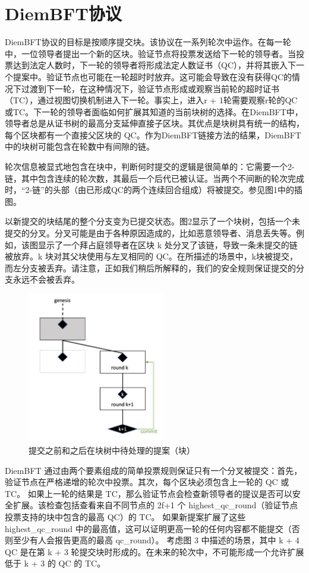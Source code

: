 \section{DiemBFT协议}

DiemBFT协议的目标是按顺序提交块。该协议在一系列轮次中运作。在每一轮中，一位领导者提出一个新的区块。验证节点将投票发送给下一轮的领导者。当投票达到法定人数时，下一轮的领导者将形成法定人数证书（QC），并将其嵌入下一个提案中。验证节点也可能在一轮超时时放弃。这可能会导致在没有获得QC的情况下过渡到下一轮，在这种情况下，验证节点形成或观察当前轮的超时证书（TC），通过视图切换机制进入下一轮。事实上，进入r + 1轮需要观察r轮的QC或TC。下一轮的领导者面临如何扩展其知道的当前块树的选择。在DiemBFT中，领导者总是从证书树的最高分支延伸直接子区块。其优点是块树具有统一的结构，每个区块都有一个直接父区块的 QC。作为DiemBFT链接方法的结果，DiemBFT中的块树可能包含在轮数中有间隙的链。

轮次信息被显式地包含在块中，判断何时提交的逻辑是很简单的：它需要一个2-链，其中包含连续的轮次数，其最后一个后代已被认证。当两个不间断的轮次完成时，“2-链”的头部（由已形成QC的两个连续回合组成）将被提交。参见图1中的插图。

以新提交的块结尾的整个分支变为已提交状态。图2显示了一个块树，包括一个未提交的分叉。分叉可能是由于各种原因造成的，比如恶意领导者、消息丢失等。例如，该图显示了一个拜占庭领导者在区块 k 处分叉了该链，导致一条未提交的链被放弃。k 块对其父块使用与左叉相同的 QC。在所描述的场景中，k块被提交，而左分支被丢弃。请注意，正如我们稍后所解释的，我们的安全规则保证提交的分支永远不会被丢弃。

\begin{figure}[htbp]
    \centering
    \includegraphics[width=6cm]{figures/image2.jpg}
    \caption{提交之前和之后在块树中待处理的提案（块）}
    \label{image2}
\end{figure}

DiemBFT 通过由两个要素组成的简单投票规则保证只有一个分叉被提交：首先，验证节点在严格递增的轮次中投票。其次，每个区块必须包含上一轮的 QC 或 TC。 如果上一轮的结果是 TC，那么验证节点会检查新领导者的提议是否可以安全扩展。该检查包括查看来自不同节点的 2f+1 个 highest\_qc\_round（验证节点投票支持的块中包含的最高 QC）的 TC。 如果新提案扩展了这些 highest\_qc\_round 中的最高值，这可以证明更高一轮的任何内容都不能提交（否则至少有人会报告更高的最高 qc\_round）。 考虑图 3 中描述的场景，其中 k + 4 QC 是在第 k + 3 轮提交块时形成的。在未来的轮次中，不可能形成一个允许扩展低于 k + 3 的 QC 的 TC。

